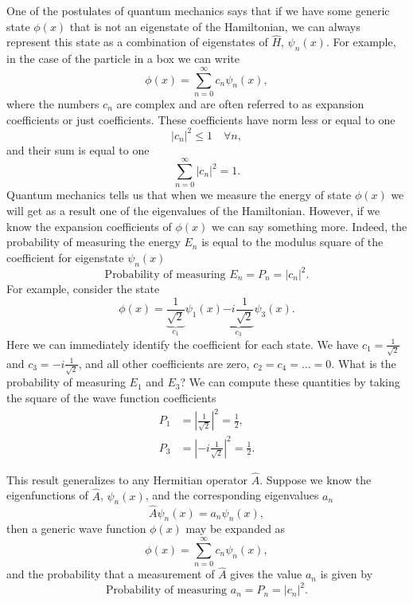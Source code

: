 \documentclass[../Main/chem331-notes.tex]{subfiles}
\begin{document}
One of the postulates of quantum mechanics says that if we have some generic state $\phi(x)$ that is not an eigenstate of the Hamiltonian, we can always represent this state as a combination of eigenstates of $\hat{H}$, $\psi_n(x)$. For example, in the case of the particle in a box we can write
\begin{equation}
\phi(x) = \sum_{n = 0}^\infty c_n \psi_n(x),
\end{equation}
where the numbers $c_n$ are complex and are often referred to as expansion coefficients or just coefficients.
These coefficients have norm less or equal to one
\begin{equation}
|c_n|^2 \leq 1 \quad \forall n,
\end{equation}
and their sum is equal to one
\begin{equation}
\sum_{n = 0}^\infty |c_n|^2 = 1.
\end{equation}
Quantum mechanics tells us that when we measure the energy of state $\phi(x)$ we will get as a result one of the eigenvalues of the Hamiltonian.
However, if we know the expansion coefficients of $\phi(x)$ we can say something more.
Indeed, the probability of measuring the energy $E_n$ is equal to the modulus square of the coefficient for eigenstate $\psi_n(x)$
\begin{equation}
\text{Probability of measuring } E_n = P_n = |c_n|^2.
\end{equation}
For example, consider the state
\begin{equation}
\phi(x) = \underbrace{\frac{1}{\sqrt{2}}}_{c_1} \psi_1(x) \underbrace{- i \frac{1}{\sqrt{2}}}_{c_3} \psi_3(x).
\end{equation}
Here we can immediately identify the coefficient for each state. We have $c_1 = \frac{1}{\sqrt{2}}$ and $c_3 = - i \frac{1}{\sqrt{2}}$, and all other coefficients are zero, $c_2 = c_4 = \ldots = 0$.
What is the probability of measuring $E_1$ and $E_3$? We can compute these quantities by taking the square of the wave function coefficients
\begin{equation}
\begin{split}
P_1 &= \left|\frac{1}{\sqrt{2}}\right|^2 = \frac{1}{2},\\
P_3 &= \left|-i\frac{1}{\sqrt{2}}\right|^2 = \frac{1}{2}.
\end{split}
\end{equation}

This result generalizes to any Hermitian operator $\hat{A}$. Suppose we know the eigenfunctions of $\hat{A}$, $\psi_n(x)$, and the corresponding eigenvalues $a_n$
\begin{equation}
\hat{A} \psi_n(x) = a_n \psi_n(x),
\end{equation}
then a generic wave function $\phi(x)$ may be expanded as
\begin{equation}
\phi(x) = \sum_{n = 0}^\infty c_n \psi_n(x),
\end{equation}
 and the probability that a measurement of $\hat{A}$ gives the value $a_n$ is given by
 \begin{equation}
\text{Probability of measuring } a_n = P_n = |c_n|^2.
\end{equation}
\end{document}
